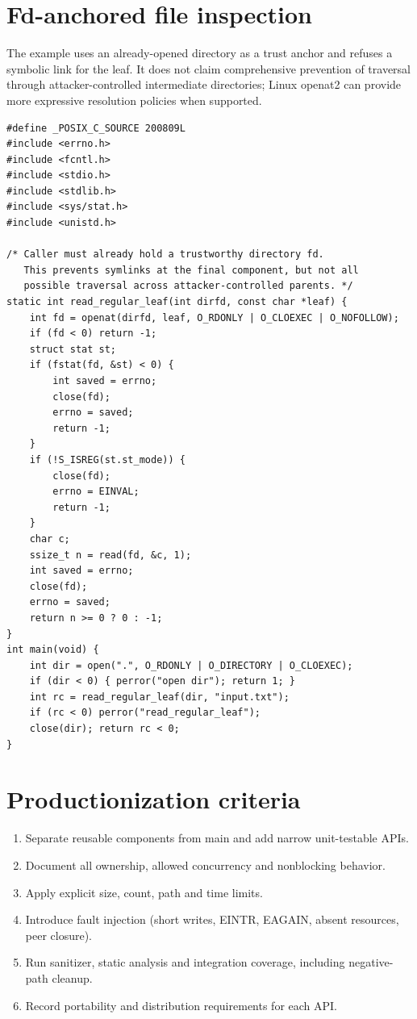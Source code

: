 \documentclass[11pt,letterpaper,oneside]{report}
\begin{document}
\chapter{Fd-anchored file inspection}
The example uses an already-opened directory as a trust anchor and refuses a symbolic link for the leaf. It does not claim comprehensive prevention of traversal through attacker-controlled intermediate directories; Linux openat2 can provide more expressive resolution policies when supported.

\begin{lstlisting}
#define _POSIX_C_SOURCE 200809L
#include <errno.h>
#include <fcntl.h>
#include <stdio.h>
#include <stdlib.h>
#include <sys/stat.h>
#include <unistd.h>

/* Caller must already hold a trustworthy directory fd.
   This prevents symlinks at the final component, but not all
   possible traversal across attacker-controlled parents. */
static int read_regular_leaf(int dirfd, const char *leaf) {
    int fd = openat(dirfd, leaf, O_RDONLY | O_CLOEXEC | O_NOFOLLOW);
    if (fd < 0) return -1;
    struct stat st;
    if (fstat(fd, &st) < 0) {
        int saved = errno;
        close(fd);
        errno = saved;
        return -1;
    }
    if (!S_ISREG(st.st_mode)) {
        close(fd);
        errno = EINVAL;
        return -1;
    }
    char c;
    ssize_t n = read(fd, &c, 1);
    int saved = errno;
    close(fd);
    errno = saved;
    return n >= 0 ? 0 : -1;
}
int main(void) {
    int dir = open(".", O_RDONLY | O_DIRECTORY | O_CLOEXEC);
    if (dir < 0) { perror("open dir"); return 1; }
    int rc = read_regular_leaf(dir, "input.txt");
    if (rc < 0) perror("read_regular_leaf");
    close(dir); return rc < 0;
}
\end{lstlisting}
\chapter{Productionization criteria}
\begin{enumerate}
\item Separate reusable components from main and add narrow unit-testable APIs.
\item Document all ownership, allowed concurrency and nonblocking behavior.
\item Apply explicit size, count, path and time limits.
\item Introduce fault injection (short writes, EINTR, EAGAIN, absent resources, peer closure).
\item Run sanitizer, static analysis and integration coverage, including negative-path cleanup.
\item Record portability and distribution requirements for each API.
\end{enumerate}
\end{document}
